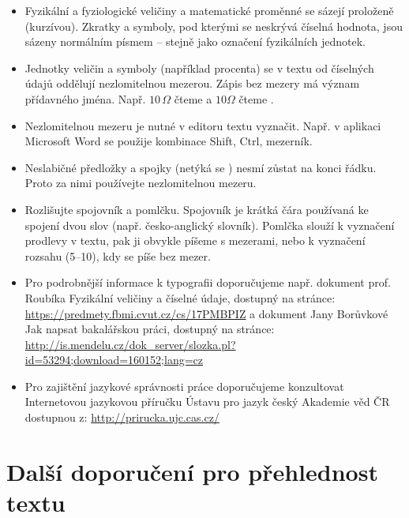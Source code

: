 \begin{itemize}
    \item Fyzikální a fyziologické veličiny a matematické proměnné se sázejí proloženě (kurzívou). Zkratky a symboly, pod kterými se neskrývá číselná hodnota, jsou sázeny normálním písmem – stejně jako označení fyzikálních jednotek.
    \item Jednotky veličin a symboly (například procenta) se v textu od číselných údajů oddělují nezlomitelnou mezerou. Zápis bez mezery má význam přídavného jména. Např. $10\,\Omega$ čteme  a $10\Omega$ čteme .
    \item Nezlomitelnou mezeru je nutné v editoru textu vyznačit. Např. v aplikaci Microsoft Word se použije kombinace Shift, Ctrl, mezerník. 
    \item Neslabičné předložky a spojky (netýká se ) nesmí zůstat na konci řádku. Proto za nimi používejte nezlomitelnou mezeru.
    \item Rozlišujte spojovník a pomlčku. Spojovník je krátká čára používaná ke spojení dvou slov (např. česko-anglický slovník). Pomlčka slouží k vyznačení prodlevy v textu, pak ji obvykle píšeme s mezerami, nebo k vyznačení rozsahu (5–10), kdy se píše bez mezer.
    \item Pro podrobnější informace k typografii doporučujeme např. dokument prof. Roubíka Fyzikální veličiny a číselné údaje, dostupný na stránce:
\url{https://predmety.fbmi.cvut.cz/cs/17PMBPIZ}
a dokument Jany Borůvkové Jak napsat bakalářskou práci, dostupný na stránce:
\url{http://is.mendelu.cz/dok_server/slozka.pl?id=53294;download=160152;lang=cz}
    \item Pro zajištění jazykové správnosti práce doporučujeme konzultovat Internetovou jazykovou příručku Ústavu pro jazyk český Akademie věd ČR dostupnou z: 
\url{http://prirucka.ujc.cas.cz/}
\end{itemize}
    
\clearpage

\chapter{Další doporučení pro přehlednost textu}
\label{app:doporuceni}
    
